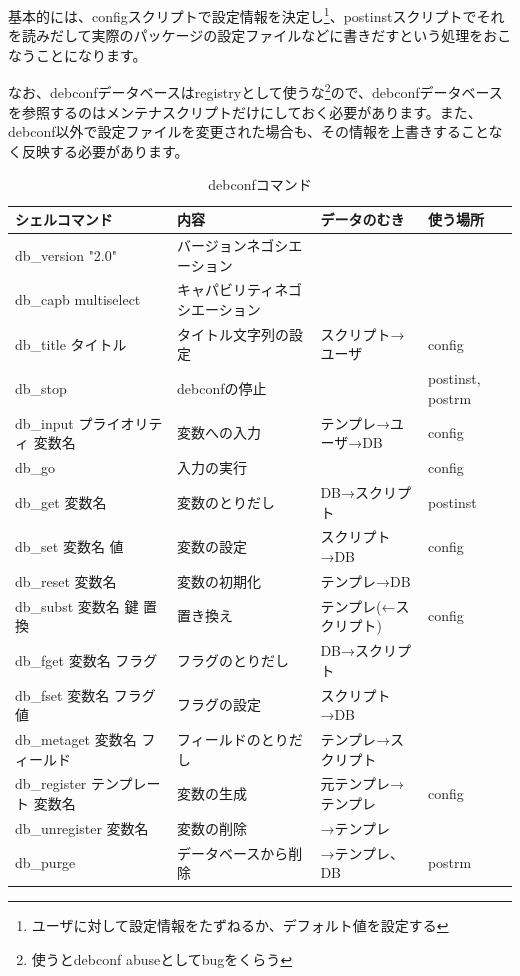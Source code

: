 \documentclass[mingoth,a4paper]{jsarticle}
\begin{document}
基本的には、configスクリプトで設定情報を決定し\footnote{ユーザに対して設定情報をたずねるか、デフォルト値を設定する}、postinstスクリプトでそれを読みだして実際のパッケージの設定ファイルなどに書きだすという処理をおこなうことになります。

なお、debconfデータベースはregistryとして使うな\footnote{使うとdebconf abuseとしてbugをくらう}ので、debconfデータベースを参照するのはメンテナスクリプトだけにしておく必要があります。また、debconf以外で設定ファイルを変更された場合も、その情報を上書きすることなく反映する必要があります。

\begin{table}[htbp]
 \begin{tabular}[htbp]{|l|l|l|l|}\hline
 シェルコマンド & 内容 & データのむき & 使う場所 \\ \hline
 db\_version "2.0"& バージョンネゴシエーション & & \\ \hline
 db\_capb multiselect & キャパビリティネゴシエーション & & \\ \hline
 db\_title タイトル & タイトル文字列の設定 & スクリプト→ユーザ & config \\ \hline
 db\_stop & debconfの停止 & & postinst, postrm \\ \hline
 db\_input プライオリティ 変数名 & 変数への入力 & テンプレ→ユーザ→DB & config \\ \hline
 db\_go & 入力の実行 & & config \\ \hline
 db\_get 変数名 & 変数のとりだし & DB→スクリプト & postinst \\ \hline
 db\_set 変数名 値 & 変数の設定 & スクリプト→DB & config \\ \hline
 db\_reset 変数名 & 変数の初期化 & テンプレ→DB & \\ \hline
 db\_subst 変数名 鍵 置換 & 置き換え & テンプレ(←スクリプト) & config \\ \hline
 db\_fget 変数名 フラグ & フラグのとりだし & DB→スクリプト & \\ \hline
 db\_fset 変数名 フラグ 値 & フラグの設定 & スクリプト→DB & \\ \hline
 db\_metaget 変数名 フィールド & フィールドのとりだし & テンプレ→スクリプト & \\ \hline
 db\_register テンプレート 変数名 & 変数の生成 & 元テンプレ→テンプレ & config \\ \hline
 db\_unregister 変数名 & 変数の削除 & →テンプレ & \\ \hline
 db\_purge & データベースから削除 & →テンプレ、DB & postrm \\ \hline
 \end{tabular}
 \caption{debconfコマンド}
 \label{debconf:cmd}
\end{table}
\end{document}
